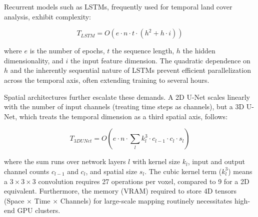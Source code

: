 \documentclass[
  journal,
  onecolumn]{IEEEtran}
\begin{document}
Recurrent models such as LSTMs, frequently used for temporal land cover
analysis, exhibit complexity:

\[T_{LSTM} = O(e \cdot n \cdot t \cdot (h^2 + h \cdot i))\]

where \(e\) is the number of epochs, \(t\) the sequence length, \(h\)
the hidden dimensionality, and \(i\) the input feature dimension. The
quadratic dependence on \(h\) and the inherently sequential nature of
LSTMs prevent efficient parallelization across the temporal axis, often
extending training to several hours.

Spatial architectures further escalate these demands. A 2D U-Net scales
linearly with the number of input channels (treating time steps as
channels), but a 3D U-Net, which treats the temporal dimension as a
third spatial axis, follows:

\[T_{3DUNet} = O\left(e \cdot n \cdot \sum_{l} k_l^3 \cdot c_{l-1} \cdot c_l \cdot s_l\right)\]

where the sum runs over network layers \(l\) with kernel size \(k_l\),
input and output channel counts \(c_{l-1}\) and \(c_l\), and spatial
size \(s_l\). The cubic kernel term (\(k_l^3\)) means a
\(3 \times 3 \times 3\) convolution requires 27 operations per voxel,
compared to 9 for a 2D equivalent. Furthermore, the memory (VRAM)
required to store 4D tensors (Space \(\times\) Time \(\times\) Channels)
for large-scale mapping routinely necessitates high-end GPU clusters.

\renewcommand\refname{References}
  
\end{document}

